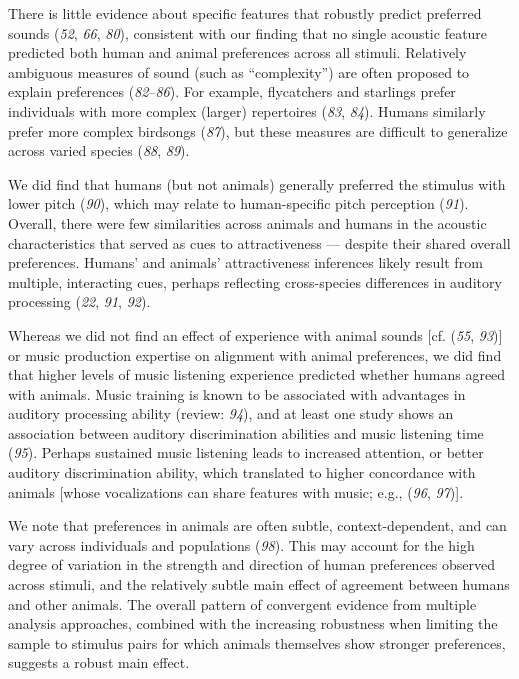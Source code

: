 \documentclass[
]{article}
\begin{document}
There is little evidence about specific features that robustly predict
preferred sounds (\emph{52}, \emph{66}, \emph{80}), consistent with our
finding that no single acoustic feature predicted both human and animal
preferences across all stimuli. Relatively ambiguous measures of sound
(such as ``complexity'') are often proposed to explain preferences
(\emph{82}--\emph{86}). For example, flycatchers and starlings prefer
individuals with more complex (larger) repertoires (\emph{83},
\emph{84}). Humans similarly prefer more complex birdsongs (\emph{87}),
but these measures are difficult to generalize across varied species
(\emph{88}, \emph{89}).

We did find that humans (but not animals) generally preferred the
stimulus with lower pitch (\emph{90}), which may relate to
human-specific pitch perception (\emph{91}). Overall, there were few
similarities across animals and humans in the acoustic characteristics
that served as cues to attractiveness --- despite their shared overall
preferences. Humans' and animals' attractiveness inferences likely
result from multiple, interacting cues, perhaps reflecting cross-species
differences in auditory processing (\emph{22}, \emph{91}, \emph{92}).

Whereas we did not find an effect of experience with animal sounds
{[}cf. (\emph{55}, \emph{93}){]} or music production expertise on
alignment with animal preferences, we did find that higher levels of
music listening experience predicted whether humans agreed with animals.
Music training is known to be associated with advantages in auditory
processing ability (review: \emph{94}), and at least one study shows an
association between auditory discrimination abilities and music
listening time (\emph{95}). Perhaps sustained music listening leads to
increased attention, or better auditory discrimination ability, which
translated to higher concordance with animals {[}whose vocalizations can
share features with music; e.g., (\emph{96}, \emph{97}){]}.

We note that preferences in animals are often subtle, context-dependent,
and can vary across individuals and populations (\emph{98}). This may
account for the high degree of variation in the strength and direction
of human preferences observed across stimuli, and the relatively subtle
main effect of agreement between humans and other animals. The overall
pattern of convergent evidence from multiple analysis approaches,
combined with the increasing robustness when limiting the sample to
stimulus pairs for which animals themselves show stronger preferences,
suggests a robust main effect.
\end{document}
